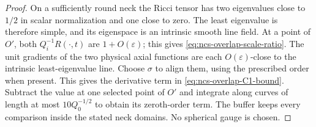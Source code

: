 \documentclass[10pt]{coll-l}
\theoremstyle{definition}
\theoremstyle{remark}
\numberwithin{section}{chapter}
\numberwithin{equation}{chapter}
\begin{document}
\begin{proof}
On a sufficiently round neck the Ricci tensor has two eigenvalues close to
$1/2$ in scalar normalization and one close to zero.  The least eigenvalue
is therefore simple, and its eigenspace is an intrinsic smooth line field.
At a point of $O'$, both $Q_i^{-1}R(\cdot,t)$ are
$1+O(\varepsilon)$; this gives \eqref{eq:ncs-overlap-scale-ratio}.  The
unit gradients of the two physical axial functions are each
$O(\varepsilon)$-close to the intrinsic least-eigenvalue line.  Choose
$\sigma$ to align them, using the prescribed order when present.  This
gives the derivative term in \eqref{eq:ncs-overlap-C1-bound}.  Subtract the
value at one selected point of $O'$ and integrate along curves of length at
most $10Q_0^{-1/2}$ to obtain its zeroth-order term.  The buffer keeps every
comparison inside the stated neck domains.  No spherical gauge is chosen.
\end{proof}
\end{document}
